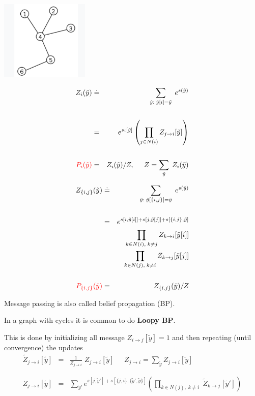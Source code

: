 {

\centerline{\includegraphics[height=1.5in]{../images/Tree}}

\begin{eqnarray*}
Z_i(\tilde{y}) & \doteq & \sum_{\hat{y}:\; \hat{y}[i] = \tilde{y}} \;e^{s(\hat{y})} \\
\\
& = & e^{s_i[\tilde{y}]} \left(\prod_{j\in N(i)} Z_{j \rightarrow i}[\tilde{y}]\right) \\
\\
{\color{red} P_i(\tilde{y})} & = & Z_i(\tilde{y})/Z,\;\;\;\;\; Z = \sum_{\tilde{y}}\;Z_i(\tilde{y})
\end{eqnarray*}



\begin{eqnarray*}
Z_{\{i,j\}}(\tilde{y}) & \doteq & \sum_{\hat{y}:\; \hat{y}[\{i,j\}] = \tilde{y}} \;e^{s(\hat{y})} \\
\\
& = & e^{s[i,\tilde{y}[i]] + s[j,\tilde{y}[j]] +s[\{i,j\},\tilde{y}]} \\
& & \prod_{k\in N(i),\;k \not = j} Z_{k \rightarrow i}[\tilde{y}[i]] \\
& & \prod_{k\in N(j),\;k \not = i} Z_{k \rightarrow j}[\tilde{y}[j]] \\
\\
{\color{red} P_{\{i,j\}}(\tilde{y})} & = & Z_{\{i,j\}}(\tilde{y})/Z
\end{eqnarray*}


Message passing is also called belief propagation (BP).

\vfill
In a graph with cycles it is common to do {\bf Loopy BP}.

\vfill
This is done by initializing all message $Z_{i \rightarrow j}[\tilde{y}] = 1$ and then repeating (until convergence) the updates
\vfill
\begin{eqnarray*}
  \tilde{Z}_{j \rightarrow i}[\tilde{y}] & = & \frac{1}{Z_{j \rightarrow i}}\;Z_{j \rightarrow i}[\tilde{y}] \;\;\;\;\;Z_{j \rightarrow i} = \sum_{\tilde{y}} Z_{j \rightarrow i}[\tilde{y}] \\
  \\
  \\
  Z_{j\rightarrow i}[\tilde{y}] & = & \sum_{\tilde{y}'}  e^{s[j,\tilde{y}'] + s[\{j,i\},\{\tilde{y}',\tilde{y}\}]}
    \left(\prod_{k \in N(j),\;k \not = i}\;\tilde{Z}_{k\rightarrow j}[\tilde{y}']\right)
\end{eqnarray*}

}
